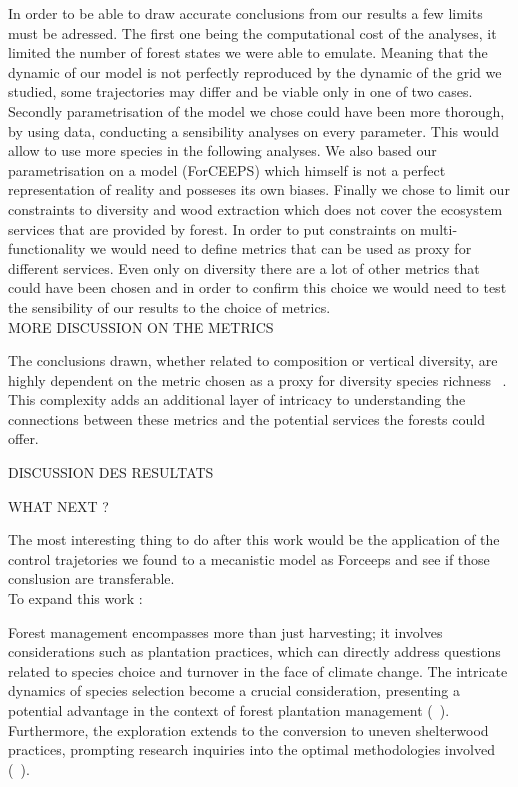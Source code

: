 \documentclass{article}
\begin{document}
In order to be able to draw accurate conclusions from our results a few limits must be adressed. The first one being the computational cost of the analyses, it limited the number of forest states we were able to emulate. Meaning that the dynamic of our model is not perfectly reproduced by the dynamic of the grid we studied, some trajectories may differ and be viable only in one of two cases. Secondly parametrisation of the model we chose could have been more thorough, by using data, conducting a sensibility analyses on every parameter. This would allow to use more species in the following analyses. We also based our parametrisation on a model (ForCEEPS) which himself is not a perfect representation of reality and posseses its own biases. Finally we chose to limit our constraints to diversity and wood extraction which does not cover the ecosystem services that are provided by forest. In order to put constraints on multi-functionality we would need to define metrics that can be used as proxy for different services. Even only on diversity there are a lot of other metrics that could have been chosen and in order to confirm this choice we would need to test the sensibility of our results to the choice of metrics.\\

MORE DISCUSSION ON THE METRICS

The conclusions drawn, whether related to composition or vertical diversity, are highly dependent on the metric chosen as a proxy for diversity species richness ~\autocite{juckerClimateModulatesEffects2016, guldinRoleUnevenAgedSilviculture1996, noletComparingEffectsEven2018}. This complexity adds an additional layer of intricacy to understanding the connections between these metrics and the potential services the forests could offer. 

DISCUSSION DES RESULTATS



WHAT NEXT ?

The most interesting thing to do after this work would be the application of the control trajetories we found to a mecanistic model as Forceeps and see if those conslusion are transferable.\\

To expand this work :

Forest management encompasses more than just harvesting; it involves considerations such as plantation practices, which can directly address questions related to species choice and turnover in the face of climate change. The intricate dynamics of species selection become a crucial consideration, presenting a potential advantage in the context of forest plantation management (~\autocite{brockerhoffPlantationForestsBiodiversity2008}). Furthermore, the exploration extends to the conversion to uneven shelterwood practices, prompting research inquiries into the optimal methodologies involved (~\autocite{sinhaOptimalManagementNaturally2017,dudumanForestManagementPlanning2011,nylandEvenUnevenagedChallenges2003}).
\end{document}
